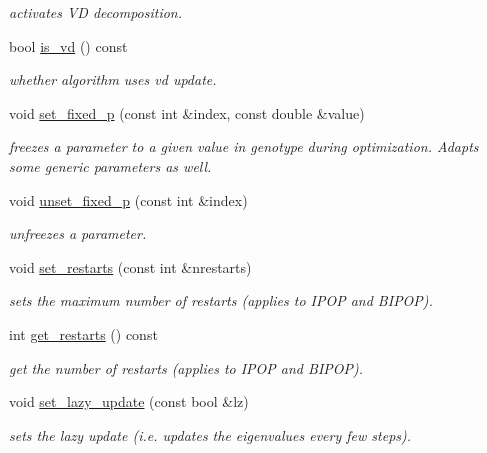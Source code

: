 \begin{DoxyCompactItemize}
\begin{DoxyCompactList}\small\item\em activates V\+D decomposition. \end{DoxyCompactList}\item 
bool \hyperlink{classlibcmaes_1_1CMAParameters_a9890c37acc093a449fa36750241f22fd}{is\+\_\+vd} () const 
\begin{DoxyCompactList}\small\item\em whether algorithm uses vd update. \end{DoxyCompactList}\item 
void \hyperlink{classlibcmaes_1_1CMAParameters_a73af8cdc07dc3388c40a27ddbdea96b4}{set\+\_\+fixed\+\_\+p} (const int \&index, const double \&value)
\begin{DoxyCompactList}\small\item\em freezes a parameter to a given value in genotype during optimization. Adapts some generic parameters as well. \end{DoxyCompactList}\item 
void \hyperlink{classlibcmaes_1_1CMAParameters_adb4f043e62081a8910d54f87db3b6ef4}{unset\+\_\+fixed\+\_\+p} (const int \&index)
\begin{DoxyCompactList}\small\item\em unfreezes a parameter. \end{DoxyCompactList}\item 
void \hyperlink{classlibcmaes_1_1CMAParameters_a105789bdd00467411107db57302028f2}{set\+\_\+restarts} (const int \&nrestarts)
\begin{DoxyCompactList}\small\item\em sets the maximum number of restarts (applies to I\+P\+O\+P and B\+I\+P\+O\+P). \end{DoxyCompactList}\item 
int \hyperlink{classlibcmaes_1_1CMAParameters_aee2680a27ebcf7f9129e3254a70b356a}{get\+\_\+restarts} () const 
\begin{DoxyCompactList}\small\item\em get the number of restarts (applies to I\+P\+O\+P and B\+I\+P\+O\+P). \end{DoxyCompactList}\item 
void \hyperlink{classlibcmaes_1_1CMAParameters_a0633711fb573b719cf698a9844d9d4f6}{set\+\_\+lazy\+\_\+update} (const bool \&lz)
\begin{DoxyCompactList}\small\item\em sets the lazy update (i.\+e. updates the eigenvalues every few steps). \end{DoxyCompactList}\item 

\end{DoxyCompactItemize}
